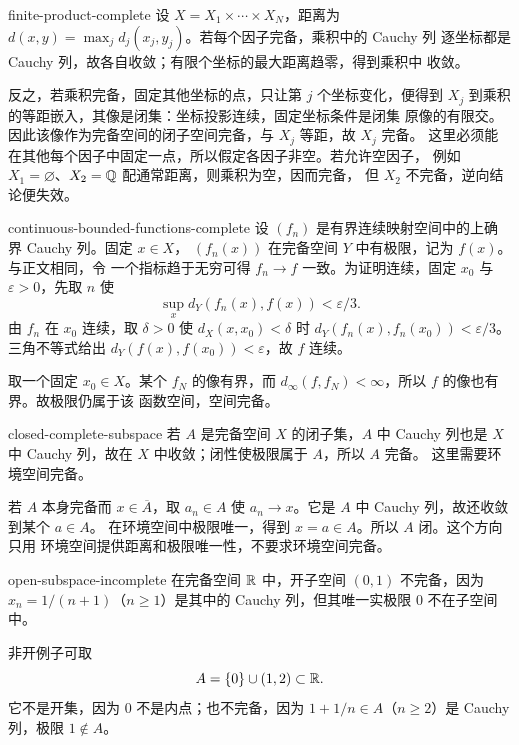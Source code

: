 \begin{solution}{finite-product-complete}
设 \(X=X_1\times\cdots\times X_N\)，距离为
\(d(x,y)=\max_jd_j(x_j,y_j)\)。若每个因子完备，乘积中的 Cauchy 列
逐坐标都是 Cauchy 列，故各自收敛；有限个坐标的最大距离趋零，得到乘积中
收敛。

反之，若乘积完备，固定其他坐标的点，只让第 \(j\) 个坐标变化，便得到
\(X_j\) 到乘积的等距嵌入，其像是闭集：坐标投影连续，固定坐标条件是闭集
原像的有限交。因此该像作为完备空间的闭子空间完备，与 \(X_j\) 等距，故
\(X_j\) 完备。
这里必须能在其他每个因子中固定一点，所以假定各因子非空。若允许空因子，
例如 \(X_1=\varnothing\)、\(X_2=\mathbb{Q}\) 配通常距离，则乘积为空，因而完备，
但 \(X_2\) 不完备，逆向结论便失效。
\end{solution}

\begin{solution}{continuous-bounded-functions-complete}
设 \((f_n)\) 是有界连续映射空间中的上确界 Cauchy 列。固定 \(x\in X\)，
\((f_n(x))\) 在完备空间 \(Y\) 中有极限，记为 \(f(x)\)。与正文相同，令
一个指标趋于无穷可得 \(f_n\to f\) 一致。为证明连续，固定
\(x_0\) 与 \(\varepsilon>0\)，先取 \(n\) 使
\[
 \sup_xd_Y(f_n(x),f(x))<\varepsilon/3.
\]
由 \(f_n\) 在 \(x_0\) 连续，取 \(\delta>0\) 使
\(d_X(x,x_0)<\delta\) 时
\(d_Y(f_n(x),f_n(x_0))<\varepsilon/3\)。三角不等式给出
\(d_Y(f(x),f(x_0))<\varepsilon\)，故 \(f\) 连续。

取一个固定 \(x_0\in X\)。某个 \(f_N\) 的像有界，而
\(d_\infty(f,f_N)<\infty\)，所以 \(f\) 的像也有界。故极限仍属于该
函数空间，空间完备。
\end{solution}

\begin{solution}{closed-complete-subspace}
若 \(A\) 是完备空间 \(X\) 的闭子集，\(A\) 中 Cauchy 列也是 \(X\) 中
Cauchy 列，故在 \(X\) 中收敛；闭性使极限属于 \(A\)，所以 \(A\) 完备。
这里需要环境空间完备。

若 \(A\) 本身完备而 \(x\in\overline A\)，取 \(a_n\in A\) 使
\(a_n\to x\)。它是 \(A\) 中 Cauchy 列，故还收敛到某个 \(a\in A\)。
在环境空间中极限唯一，得到 \(x=a\in A\)。所以 \(A\) 闭。这个方向只用
环境空间提供距离和极限唯一性，不要求环境空间完备。
\end{solution}

\begin{solution}{open-subspace-incomplete}
在完备空间 \(\mathbb{R}\) 中，开子空间 \((0,1)\) 不完备，因为
\(x_n=1/(n+1)\)（\(n\ge1\)）是其中的 Cauchy 列，但其唯一实极限
\(0\) 不在子空间中。

非开例子可取
\[
 A=\{0\}\cup(1,2)\subset\mathbb{R}.
\]
它不是开集，因为 \(0\) 不是内点；也不完备，因为
\(1+1/n\in A\)（\(n\ge2\)）是 Cauchy 列，极限 \(1\notin A\)。
\end{solution}

